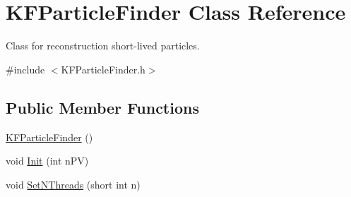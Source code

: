 \hypertarget{classKFParticleFinder}{}\section{K\+F\+Particle\+Finder Class Reference}
\label{classKFParticleFinder}


Class for reconstruction short-\/lived particles.  




{\ttfamily \#include $<$K\+F\+Particle\+Finder.\+h$>$}

\subsection*{Public Member Functions}
\begin{DoxyCompactItemize}
\item 
\hyperlink{classKFParticleFinder_a843c0b2e44c18b632c04a9fa1ff9ae49}{K\+F\+Particle\+Finder} ()
\item 
void \hyperlink{classKFParticleFinder_abe90e8047fc0a6c45dfbfb05fdb5ddcc}{Init} (int n\+PV)
\item 
void \hyperlink{classKFParticleFinder_abf400bd4463a8b7214ff4cd5cfc23f4a}{Set\+N\+Threads} (short int n)\hypertarget{classKFParticleFinder_abf400bd4463a8b7214ff4cd5cfc23f4a}{}\label{classKFParticleFinder_abf400bd4463a8b7214ff4cd5cfc23f4a}


\end{DoxyCompactItemize}
